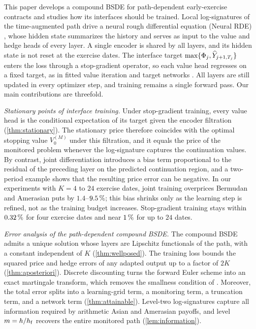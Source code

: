 This paper develops a compound BSDE for path-dependent early-exercise contracts and studies how its interfaces should be trained. Local log-signatures of the time-augmented path drive a neural rough differential equation (Neural RDE) \cite{morrill2021}, whose hidden state summarizes the history and serves as input to the value and hedge heads of every layer. A single encoder is shared by all layers, and its hidden state is not reset at the exercise dates. The interface target $\max\{\Phi_j,\widehat Y_{j+1,T_j}\}$ enters the loss through a stop-gradient operator, so each value head regresses on a fixed target, as in fitted value iteration and target networks \cite{mnih2015}. All layers are still updated in every optimizer step, and training remains a single forward pass. Our main contributions are threefold.

\emph{Stationary points of interface training.} Under stop-gradient training, every value head is the conditional expectation of its target given the encoder filtration (\cref{thm:stationary}). The stationary price therefore coincides with the optimal stopping value $V_0^{(M)}$ under this filtration, and it equals the price of the monitored problem whenever the log-signature captures the continuation values. By contrast, joint differentiation introduces a bias term proportional to the residual of the preceding layer on the predicted continuation region, and a two-period example shows that the resulting price error can be negative. In our experiments with $K=4$ to $24$ exercise dates, joint training overprices Bermudan and Amerasian puts by $1.4$--$9.5\,\%$; this bias shrinks only as the learning step is refined, not as the training budget increases. Stop-gradient training stays within $0.32\,\%$ for four exercise dates and near $1\,\%$ for up to $24$ dates.

\emph{Error analysis of the path-dependent compound BSDE.} The compound BSDE admits a unique solution whose layers are Lipschitz functionals of the path, with a constant independent of $K$ (\cref{thm:wellposed}). The training loss bounds the squared price and hedge errors of any adapted output up to a factor of $2K$ (\cref{thm:aposteriori}). Discrete discounting turns the forward Euler scheme into an exact martingale transform, which removes the smallness condition of \cite{huang2026}. Moreover, the total error splits into a learning-grid term, a monitoring term, a truncation term, and a network term (\cref{thm:attainable}). Level-two log-signatures capture all information required by arithmetic Asian and Amerasian payoffs, and level $m=h/h_{\mathrm f}$ recovers the entire monitored path (\cref{lem:information}).

